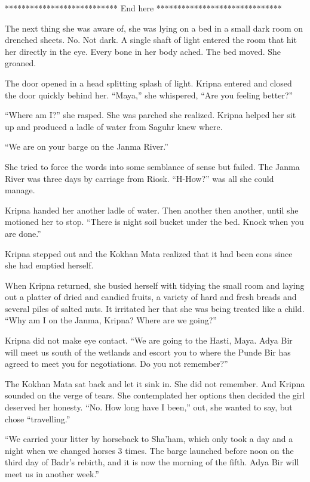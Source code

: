 \documentclass{article}
\begin{document}
	***************************
	End here
	******************************
	
	The next thing she was aware of, she was lying on a bed in a small dark room on drenched sheets. No. Not dark. A single shaft of light entered the room that hit her directly in the eye. Every bone in her body ached. The bed moved. She groaned. 
	
	The door opened in a head splitting splash of light. Kripna entered and closed the door quickly behind her. “Maya,” she whispered, “Are you feeling better?”
	
	“Where am I?” she rasped. She was parched she realized. Kripna helped her sit up and produced a ladle of water from Saguhr knew where. 
	
	“We are on your barge on the Janma River.” 
	
	She tried to force the words into some semblance of sense but failed. The Janma River was three days by carriage from Riosk. “H-How?” was all she could manage. 
	
	Kripna handed her another ladle of water. Then another then another, until she motioned her to stop. “There is night soil bucket under the bed. Knock when you are done.” 
	
	Kripna stepped out and the Kokhan Mata realized that it had been eons since she had emptied herself. 
	
	When Kripna returned, she busied herself with tidying the small room and laying out a platter of dried and candied fruits, a variety of hard and fresh breads and several piles of salted nuts. It irritated her that she was being treated like a child. “Why am I on the Janma, Kripna? Where are we going?”
	
	Kripna did not make eye contact. “We are going to the Hasti, Maya. Adya Bir will meet us south of the wetlands and escort you to where the Punde Bir has agreed to meet you for negotiations. Do you not remember?”
	
	The Kokhan Mata sat back and let it sink in. She did not remember. And Kripna sounded on the verge of tears. She contemplated her options then decided the girl deserved her honesty. “No. How long have I been,” out, she wanted to say, but chose “travelling.” 
	
	“We carried your litter by horseback to Sha’ham, which only took a day and a night when we changed horses 3 times. The barge launched before noon on the third day of Badr’s rebirth, and it is now the morning of the fifth. Adya Bir will meet us in another week.”
	
\end{document}
